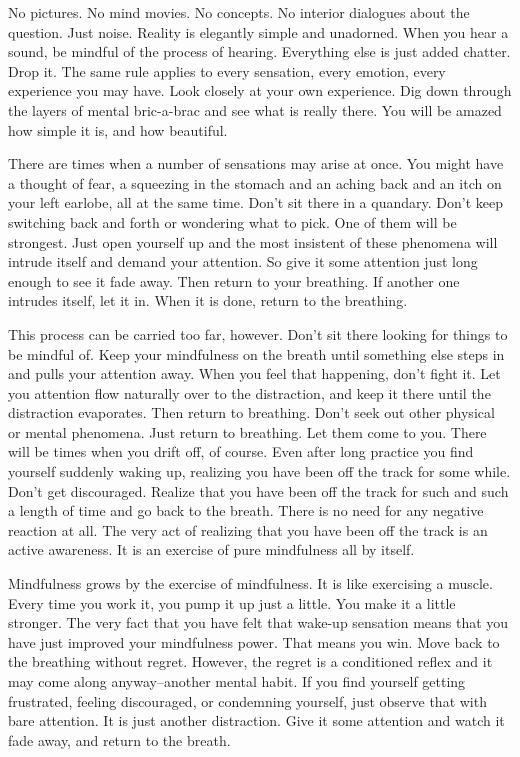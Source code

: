 No pictures. No mind movies. No concepts. No interior dialogues about the
question. Just noise. Reality is elegantly simple and unadorned. When you hear a
sound, be mindful of the process of hearing. Everything else is just added
chatter. Drop it. The same rule applies to every sensation, every emotion, every
experience you may have. Look closely at your own experience. Dig down through
the layers of mental bric-a-brac and see what is really there. You will be
amazed how simple it is, and how beautiful.

There are times when a number of sensations may arise at once. You might have a
thought of fear, a squeezing in the stomach and an aching back and an itch on
your left earlobe, all at the same time. Don't sit there in a quandary. Don't
keep switching back and forth or wondering what to pick. One of them will be
strongest. Just open yourself up and the most insistent of these phenomena will
intrude itself and demand your attention. So give it some attention just long
enough to see it fade away. Then return to your breathing. If another one
intrudes itself, let it in. When it is done, return to the breathing.

This process can be carried too far, however. Don't sit there looking for things
to be mindful of. Keep your mindfulness on the breath until something else steps
in and pulls your attention away. When you feel that happening, don't fight it.
Let you attention flow naturally over to the distraction, and keep it there
until the distraction evaporates. Then return to breathing. Don't seek out other
physical or mental phenomena. Just return to breathing. Let them come to you.
There will be times when you drift off, of course. Even after long practice you
find yourself suddenly waking up, realizing you have been off the track for some
while. Don't get discouraged. Realize that you have been off the track for such
and such a length of time and go back to the breath. There is no need for any
negative reaction at all. The very act of realizing that you have been off the
track is an active awareness. It is an exercise of pure mindfulness all by
itself.

Mindfulness grows by the exercise of mindfulness. It is like exercising a
muscle. Every time you work it, you pump it up just a little. You make it a
little stronger. The very fact that you have felt that wake-up sensation means
that you have just improved your mindfulness power. That means you win. Move
back to the breathing without regret. However, the regret is a conditioned
reflex and it may come along anyway--another mental habit. If you find yourself
getting frustrated, feeling discouraged, or condemning yourself, just observe
that with bare attention. It is just another distraction. Give it some attention
and watch it fade away, and return to the breath.

